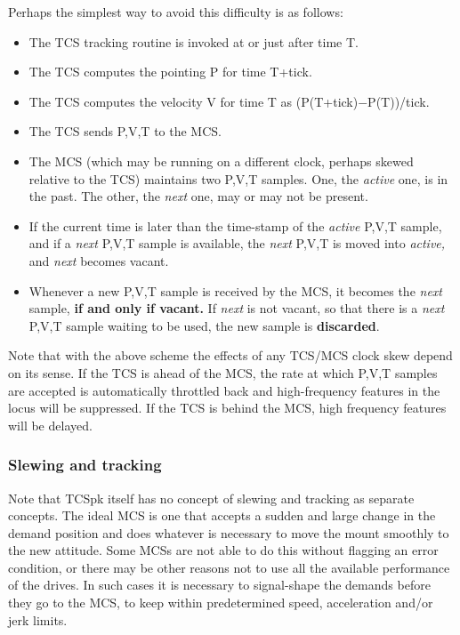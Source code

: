 \documentclass[12pt,fleqn,twoside]{article}
\renewcommand{\_}{{\tt\char'137}}     %
\begin{document}
Perhaps the simplest way to avoid this difficulty is as follows:
\begin{itemize}

\item The TCS tracking routine is invoked at or just after time T.

\item The TCS computes the pointing P for time T+tick.

\item The TCS computes the velocity V for time T as
      (P(T+tick)$-$P(T))/tick.

\item The TCS sends P,V,T to the MCS.

\item The MCS (which may be running on a different clock, perhaps
      skewed relative to the TCS) maintains two P,V,T samples.
      One, the {\it active}\/ one, is in the past. The other, the
      {\it next}\/ one, may or may not be present.

\item If the current time is later than the time-stamp of the
      {\it active}\/ P,V,T sample, and if a {\it next}\/ P,V,T
      sample is available, the {\it next}\/ P,V,T is moved into
      {\it active,} and {\it next}\/ becomes vacant.

\item Whenever a new P,V,T sample is received by the MCS, it
      becomes the {\it next}\/ sample, {\bf if and only if
      vacant.} If {\it next}\/ is not vacant, so that there is
      a {\it next}\/ P,V,T sample waiting to be used, the new
      sample is {\bf discarded}.

\end{itemize}
Note that with the above scheme the effects of any TCS/MCS clock
skew depend on its sense. If the TCS is ahead of the MCS, the rate
at which P,V,T samples are accepted is automatically throttled
back and high-frequency features in the locus will be suppressed.
If the TCS is behind the MCS, high frequency features will be
delayed.

\subsubsection{Slewing and tracking}

Note that TCSpk itself has no concept of slewing and tracking as separate
concepts.  The ideal MCS is one that accepts a sudden and large
change in the demand position and does whatever is necessary to move
the mount smoothly to the new attitude.  Some MCSs are not able to
do this without flagging an error condition, or there may be other
reasons not to use all the available performance of the drives.  In
such cases it is necessary to signal-shape the demands before they
go to the MCS, to keep within predetermined speed, acceleration and/or
jerk limits.
\end{document}
